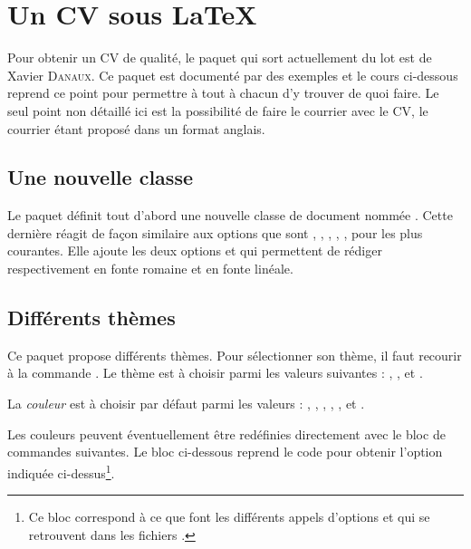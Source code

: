 
\chapter{Un CV sous \LaTeX}
\label{moderncv}
Pour obtenir un CV de qualité, le paquet qui sort actuellement du lot est  de Xavier \textsc{Danaux}. Ce paquet est documenté par des exemples et le cours ci-dessous reprend ce point pour permettre à tout à chacun d'y trouver de quoi faire. Le seul point non détaillé ici est la possibilité de faire le courrier avec le CV, le courrier étant proposé dans un format anglais.


\section{Une nouvelle classe}

Le paquet  définit tout d'abord une nouvelle classe de document nommée . Cette dernière réagit de façon similaire aux options que sont \macron{10pt}, \macron{11pt}, \macron{12pt}, , ,  pour les plus courantes. Elle ajoute les deux options  et  qui permettent de rédiger respectivement en fonte romaine et en fonte linéale.


\section{Différents thèmes}

Ce paquet propose différents thèmes. Pour sélectionner son thème, il faut recourir à la commande . 
Le thème est à choisir parmi les valeurs suivantes : , ,  et .

La \emph{couleur} est à choisir par défaut parmi les valeurs : , , , , ,  et .

Les couleurs peuvent éventuellement être redéfinies directement avec le bloc de commandes suivantes. Le bloc ci-dessous reprend le code pour obtenir l'option  indiquée ci-dessus\footnote{Ce bloc correspond à ce que font les différents appels d'options et qui se retrouvent dans les fichiers .}.

